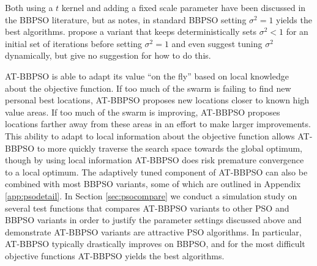 \documentclass[cmbright]{staauth}
\begin{document}
Both using a $t$ kernel and adding a fixed scale parameter have been discussed in the BBPSO literature, but as \cite{kennedy2003bare} notes, in standard BBPSO setting $\sigma^2=1$ yields the best algorithms. \cite{hsieh2010modified} propose a variant that keeps deterministically sets $\sigma^2<1$ for an initial set of iterations before setting $\sigma^2=1$ and even suggest tuning $\sigma^2$ dynamically, but give no suggestion for how to do this.

AT-BBPSO is able to adapt its value ``on the fly'' based on local knowledge about the objective function. If too much of the swarm is failing to find new personal best locations, AT-BBPSO proposes new locations closer to known high value areas. If too much of the swarm is improving, AT-BBPSO proposes locations farther away from these areas in an effort to make larger improvements. This ability to adapt to local information about the objective function allows AT-BBPSO to more quickly traverse the search space towards the global optimum, though by using local information AT-BBPSO does risk premature convergence to a local optimum. The adaptively tuned component of AT-BBPSO can also be combined with most BBPSO variants, some of which are outlined in Appendix \ref{app:psodetail}. In Section \ref{sec:psocompare} we conduct a simulation study on several test functions that compares AT-BBPSO variants to other PSO and BBPSO variants in order to justify the parameter settings discussed above and demonstrate AT-BBPSO variants are attractive PSO algorithms. In particular, AT-BBPSO typically drastically improves on BBPSO, and for the most difficult objective functions AT-BBPSO yields the best algorithms.
\end{document}
